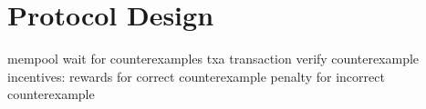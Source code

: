 \chapter{Protocol Design}\label{chap:protocol}
mempool
wait for counterexamples
txa transaction
verify counterexample
incentives: rewards for correct counterexample
			penalty for incorrect counterexample